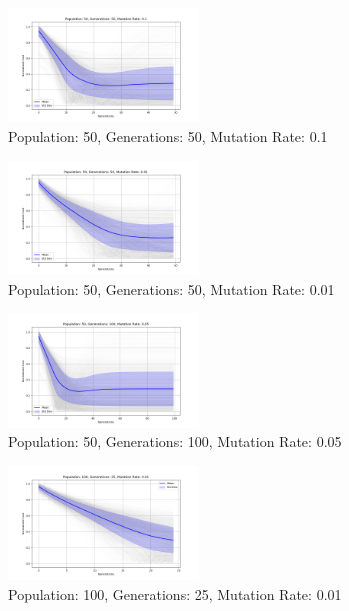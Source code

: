 \documentclass[
]{article}
\begin{document}
    \begin{figure}[H]
        \centering
        \includegraphics[width=0.45\textwidth]{genetic_algorithm/appendix/Population_50_Generations_50_MutationRate_0.1}
        \caption{Population: 50, Generations: 50, Mutation Rate: 0.1}
        \label{fig:app_ga_50_50_1}
    \end{figure}

    \begin{figure}[H]
        \centering
        \includegraphics[width=0.45\textwidth]{genetic_algorithm/appendix/Population_50_Generations_50_MutationRate_0.01}
        \caption{Population: 50, Generations: 50, Mutation Rate: 0.01}
        \label{fig:app_ga_50_50_01}
    \end{figure}


    \begin{figure}[H]
        \centering
        \includegraphics[width=0.45\textwidth]{genetic_algorithm/appendix/Population_50_Generations_100_MutationRate_0.05}
        \caption{Population: 50, Generations: 100, Mutation Rate: 0.05}
        \label{fig:app_ga_50_100_05}
    \end{figure}

    \begin{figure}[H]
        \centering
        \includegraphics[width=0.45\textwidth]{genetic_algorithm/appendix/Population_100_Generations_25_MutationRate_0.01}
        \caption{Population: 100, Generations: 25, Mutation Rate: 0.01}
        \label{fig:app_ga_100_25_01}
    \end{figure}
\end{document}
